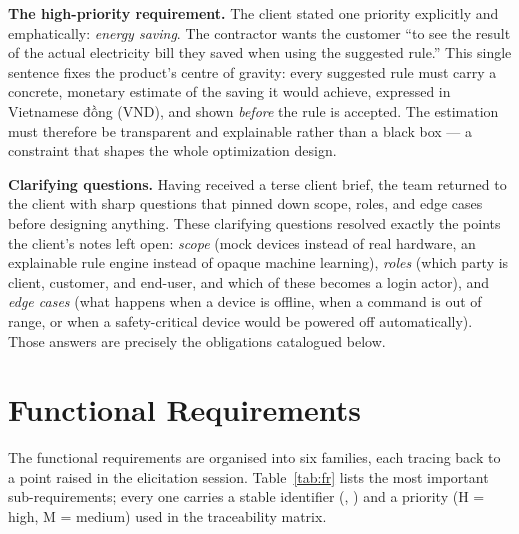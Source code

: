 \textbf{The high-priority requirement.} The client stated one priority explicitly and
emphatically: \emph{energy saving}. The contractor wants the customer ``to see the
result of the actual electricity bill they saved when using the suggested rule.''
This single sentence fixes the product's centre of gravity: every suggested rule must
carry a concrete, monetary estimate of the saving it would achieve, expressed in
Vietnamese đồng (VND), and shown \emph{before} the rule is accepted. The estimation
must therefore be transparent and explainable rather than a black box --- a constraint
that shapes the whole optimization design.

\textbf{Clarifying questions.} Having received a terse client brief, the team returned
to the client with sharp questions that pinned down scope, roles, and edge cases before
designing anything. These clarifying questions resolved exactly the points the
client's notes left open: \emph{scope} (mock devices instead of real hardware, an
explainable rule engine instead of opaque machine learning), \emph{roles} (which party
is client, customer, and end-user, and which of these becomes a login actor), and
\emph{edge cases} (what happens when a device is offline, when a command is out of
range, or when a safety-critical device would be powered off automatically). Those
answers are precisely the obligations catalogued below.

\section{Functional Requirements}
\label{sec:fr}

The functional requirements are organised into six families, each tracing back to a
point raised in the elicitation session. Table~\ref{tab:fr} lists the most important
sub-requirements; every one carries a stable identifier (,
) and a priority (H = high, M = medium) used in the traceability matrix.

